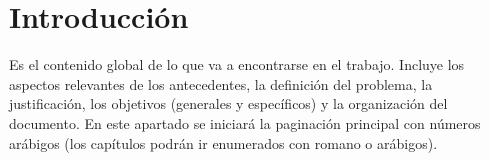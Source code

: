 \chapter{Introducción}

Es el contenido global de lo que va a encontrarse en el trabajo. Incluye los aspectos relevantes de los antecedentes, la definición del problema, la justificación, los objetivos (generales y específicos) y la organización del documento. En este apartado se iniciará la paginación principal  con números arábigos (los capítulos podrán ir enumerados con romano o arábigos).

\lipsum[2-4]

\lipsum[2-4]

\lipsum[2-4]

